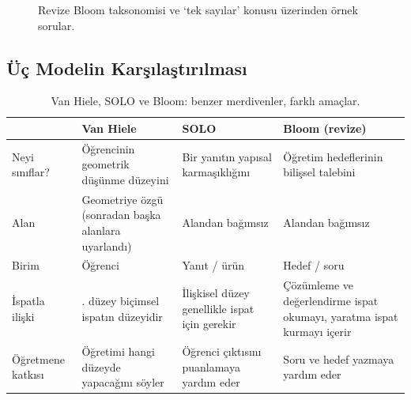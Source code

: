 \begin{figure}[h]
\centering
{}%
\caption{Revize Bloom taksonomisi ve ‘tek sayılar’ konusu üzerinden örnek sorular.}
\end{figure}

\subsection{Üç Modelin Karşılaştırılması}

\begin{table}[h]
\centering\small
\renewcommand{\arraystretch}{1.3}
\begin{tabularx}{\linewidth}{>{\raggedright\arraybackslash}p{2.4cm}>{\raggedright\arraybackslash}X>{\raggedright\arraybackslash}X>{\raggedright\arraybackslash}X}
\toprule
 & \textbf{Van Hiele} & \textbf{SOLO} & \textbf{Bloom (revize)}\\
\midrule
Neyi sınıflar? & Öğrencinin geometrik düşünme düzeyini & Bir yanıtın yapısal karmaşıklığını & Öğretim hedeflerinin bilişsel talebini\\
Alan & Geometriye özgü (sonradan başka alanlara uyarlandı) & Alandan bağımsız & Alandan bağımsız\\
Birim & Öğrenci & Yanıt / ürün & Hedef / soru\\
İspatla ilişki & 4. düzey biçimsel ispatın düzeyidir & İlişkisel düzey genellikle ispat için gerekir & Çözümleme ve değerlendirme ispat okumayı, yaratma ispat kurmayı içerir\\
Öğretmene katkısı & Öğretimi hangi düzeyde yapacağını söyler & Öğrenci çıktısını puanlamaya yardım eder & Soru ve hedef yazmaya yardım eder\\
\bottomrule
\end{tabularx}
\caption{Van Hiele, SOLO ve Bloom: benzer merdivenler, farklı amaçlar.}
\end{table}

